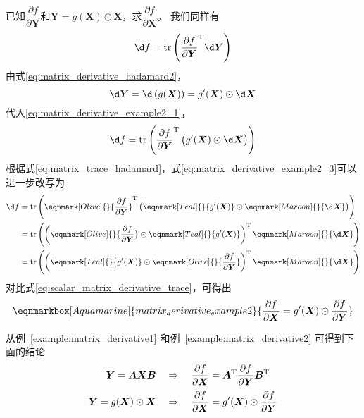 \begin{example}\label{example:matrix_derivative2}
\colorbox{Aquamarine!30}{已知$\dfrac{\partial f}{\partial \bm{Y}}$和$\bm{Y}=g(\bm{X})\odot\bm{X}$，求$\dfrac{\partial f}{\partial \bm{X}}$}。
我们同样有
\begin{equation}
	\d f = \mathrm{tr}\left({\frac{\partial f}{\partial \bm{Y}}}^{\mathrm{T}}\d \bm{Y}\right)
	\label{eq:matrix_derivative_example2_1}
\end{equation}
由式\eqref{eq:matrix_derivative_hadamard2}，
\begin{equation}
	\d \bm{Y} = \d \left(g(\bm{X})\right) = g'(\bm{X}) \odot \d \bm{X}
	\label{eq:matrix_derivative_example2_2}
\end{equation}
代入\eqref{eq:matrix_derivative_example2_1}，
\begin{equation}
	\d f = \mathrm{tr}\left({\frac{\partial f}{\partial \bm{Y}}}^{\mathrm{T}}\left(\vphantom{A^T}g'(\bm{X}) \odot \d \bm{X}\right)\right)
	\label{eq:matrix_derivative_example2_3}
\end{equation}
根据式\eqref{eq:matrix_trace_hadamard}，式\eqref{eq:matrix_derivative_example2_3}可以进一步改写为
\begin{equation}
	\begin{aligned}
		\d f 
		&= \mathrm{tr}\left(\eqnmark[Olive]{}{\frac{\partial f}{\partial \bm{Y}}}^{\mathrm{T}}\left(\vphantom{A^T}\eqnmark[Teal]{}{g'(\bm{X})} \odot \eqnmark[Maroon]{}{\d \bm{X}}\right)\right) \\
		&= \mathrm{tr}\left(\left({\eqnmark[Olive]{}{\frac{\partial f}{\partial \bm{Y}}}\odot \eqnmark[Teal]{}{g'(\bm{X})}}\right)^{\mathrm{T}}\eqnmark[Maroon]{}{\d \bm{X}}\right) \\
		&= \mathrm{tr}\left(\left({\eqnmark[Teal]{}{g'(\bm{X})} \odot \eqnmark[Olive]{}{\frac{\partial f}{\partial \bm{Y}}}}\right)^{\mathrm{T}}\eqnmark[Maroon]{}{\d \bm{X}}\right)
	\end{aligned}
\end{equation}
对比式\eqref{eq:scalar_matrix_derivative_trace}，可得出
\renewcommand{\eqnhighlightshade}{30}  %
\begin{equation}
	\eqnmarkbox[Aquamarine]{matrix_derivative_example2}{
	\frac{\partial f}{\partial \bm{X}} = g'(\bm{X}) \odot \frac{\partial f}{\partial \bm{Y}}
	}
	\label{eq:matrix_derivative_example2_4}
\end{equation}
\end{example}

从例~\ref{example:matrix_derivative1} 和例~\ref{example:matrix_derivative2} 可得到下面的结论
\begin{align}
	\bm{Y}=\bm{A}\bm{X}\bm{B} \quad &\Rightarrow \quad \frac{\partial f}{\partial \bm{X}} = \bm{A}^{\mathrm{T}}\frac{\partial f}{\partial \bm{Y}}\bm{B}^{\mathrm{T}}
	\label{eq:matrix_derivative_conclusion1} \\ %
	\bm{Y}=g(\bm{X})\odot\bm{X} \quad &\Rightarrow \quad \frac{\partial f}{\partial \bm{X}} = g'(\bm{X}) \odot \frac{\partial f}{\partial \bm{Y}} \vphantom{{\frac{\partial f}{\partial \bm{X}}}^{\mathrm{T}}}
	\label{eq:matrix_derivative_conclusion2}  %
\end{align}
